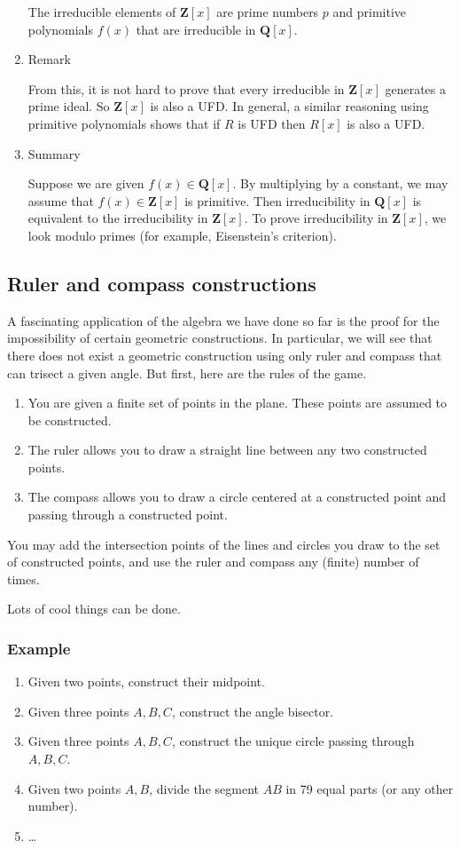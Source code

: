 \documentclass[11pt]{article}
\begin{document}
\begin{enumerate}
The irreducible elements of \(\mathbf{Z}[x]\) are prime numbers \(p\) and primitive polynomials \(f(x)\) that are irreducible in \(\mathbf{Q}[x]\).
\item Remark
\label{sec:org727ab0a}

From this, it is not hard to prove that every irreducible in \(\mathbf{Z}[x]\) generates a prime ideal.
So \(\mathbf{Z}[x]\) is also a UFD.  
In general, a similar reasoning using primitive polynomials shows that if \(R\) is UFD then \(R[x]\) is also a UFD.
\item Summary
\label{sec:org827d78a}

Suppose we are given \(f(x) \in \mathbf{Q}[x]\).
By multiplying by a constant, we may assume that \(f(x) \in \mathbf{Z}[x]\) is primitive.
Then irreducibility in \(\mathbf{Q}[x]\) is equivalent to the irreducibility in \(\mathbf{Z}[x]\).
To prove irreducibility in \(\mathbf{Z}[x]\), we look modulo primes (for example, Eisenstein's criterion).
\end{enumerate}
\subsection{Ruler and compass constructions}
\label{sec:org5c18aab}
A fascinating application of the algebra we have done so far is the proof for the impossibility of certain geometric constructions.
In particular, we will see that there does not exist a geometric construction using only ruler and compass that can trisect a given angle.
But first, here are the rules of the game.

\begin{enumerate}
\item You are given a finite set of points in the plane.  These points are assumed to be constructed.
\item The ruler allows you to draw a straight line between any two constructed points.
\item The compass allows you to draw a circle centered at a constructed point and passing through a constructed point.
\end{enumerate}

You may add the intersection points of the lines and circles you draw to the set of constructed points, and use the ruler and compass any (finite) number of times.

Lots of cool things can be done.  
\subsubsection{Example}
\label{sec:org3daece6}
\begin{enumerate}
\item Given two points, construct their midpoint.
\item Given three points \(A, B, C\), construct the angle bisector.
\item Given three points \(A, B, C\), construct the unique circle passing through \(A, B, C\).
\item Given two points \(A, B\), divide the segment \(AB\) in 79 equal parts (or any other number).
\item \ldots{}
\end{enumerate}
\end{document}
